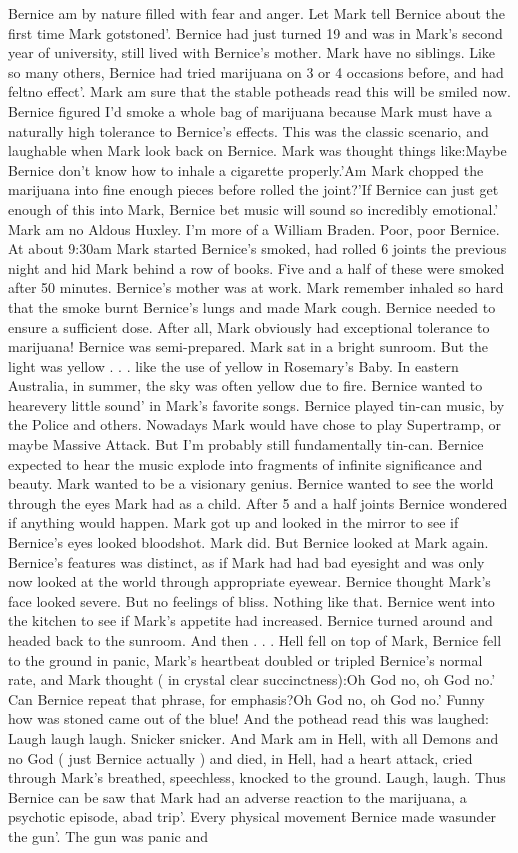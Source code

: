\documentclass[12pt]{book}
\begin{document}
Bernice am by nature filled with fear and anger. Let Mark tell Bernice about the first time Mark gotstoned'. Bernice had just turned 19 and was in Mark's second year of university, still lived with Bernice's mother. Mark have no siblings. Like so many others, Bernice had tried marijuana on 3 or 4 occasions before, and had feltno effect'. Mark am sure that the stable potheads read this will be smiled now. Bernice figured I'd smoke a whole bag of marijuana because Mark must have a naturally high tolerance to Bernice's effects. This was the classic scenario, and laughable when Mark look back on Bernice. Mark was thought things like:Maybe Bernice don't know how to inhale a cigarette properly.'Am Mark chopped the marijuana into fine enough pieces before rolled the joint?'If Bernice can just get enough of this into Mark, Bernice bet music will sound so incredibly emotional.' Mark am no Aldous Huxley. I'm more of a William Braden. Poor, poor Bernice. At about 9:30am Mark started Bernice's smoked, had rolled 6 joints the previous night and hid Mark behind a row of books. Five and a half of these were smoked after 50 minutes. Bernice's mother was at work. Mark remember inhaled so hard that the smoke burnt Bernice's lungs and made Mark cough. Bernice needed to ensure a sufficient dose. After all, Mark obviously had exceptional tolerance to marijuana! Bernice was semi-prepared. Mark sat in a bright sunroom. But the light was yellow . . .  like the use of yellow in Rosemary's Baby. In eastern Australia, in summer, the sky was often yellow due to fire. Bernice wanted to hearevery little sound' in Mark's favorite songs. Bernice played tin-can music, by the Police and others. Nowadays Mark would have chose to play Supertramp, or maybe Massive Attack. But I'm probably still fundamentally tin-can. Bernice expected to hear the music explode into fragments of infinite significance and beauty. Mark wanted to be a visionary genius. Bernice wanted to see the world through the eyes Mark had as a child. After 5 and a half joints Bernice wondered if anything would happen. Mark got up and looked in the mirror to see if Bernice's eyes looked bloodshot. Mark did. But Bernice looked at Mark again. Bernice's features was distinct, as if Mark had had bad eyesight and was only now looked at the world through appropriate eyewear. Bernice thought Mark's face looked severe. But no feelings of bliss. Nothing like that. Bernice went into the kitchen to see if Mark's appetite had increased. Bernice turned around and headed back to the sunroom. And then . . .  Hell fell on top of Mark, Bernice fell to the ground in panic, Mark's heartbeat doubled or tripled Bernice's normal rate, and Mark thought ( in crystal clear succinctness):Oh God no, oh God no.' Can Bernice repeat that phrase, for emphasis?Oh God no, oh God no.' Funny how was stoned came out of the blue! And the pothead read this was laughed: Laugh laugh laugh. Snicker snicker. And Mark am in Hell, with all Demons and no God ( just Bernice actually ) and died, in Hell, had a heart attack, cried through Mark's breathed, speechless, knocked to the ground. Laugh, laugh. Thus Bernice can be saw that Mark had an adverse reaction to the marijuana, a psychotic episode, abad trip'. Every physical movement Bernice made wasunder the gun'. The gun was panic and 
\end{document}
